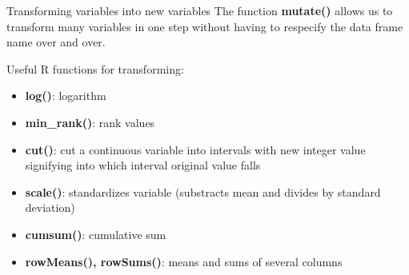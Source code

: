 \documentclass[
  ignorenonframetext,
]{beamer}
\providecommand{\tightlist}{%
  \setlength{\itemsep}{0pt}\setlength{\parskip}{0pt}}
\begin{document}
\begin{frame}{Transforming variables into new variables}
\protect\hypertarget{transforming-variables-into-new-variables}{}
The function \textbf{mutate()} allows us to transform many variables in
one step without having to respecify the data frame name over and over.

Useful R functions for transforming:

\begin{itemize}
\tightlist
\item
  \textbf{log()}: logarithm
\item
  \textbf{min\_rank()}: rank values
\item
  \textbf{cut()}: cut a continuous variable into intervals with new
  integer value signifying into which interval original value falls
\item
  \textbf{scale()}: standardizes variable (substracts mean and divides
  by standard deviation)
\item
  \textbf{cumsum()}: cumulative sum
\item
  \textbf{rowMeans(), rowSums()}: means and sums of several columns
\end{itemize}
\end{frame}
\end{document}
